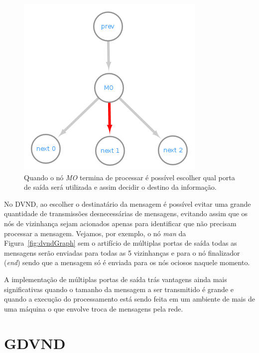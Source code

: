 \begin{figure}[htbp]
    \centerline{\includegraphics[scale=0.6]{figuras/dataflow/multi_output1.png}}
    \caption{Quando o nó \textit{MO} termina de processar é possível escolher qual porta de saída será utilizada e assim decidir o destino da informação.}
    \label{fig:dataflowMo1}
\end{figure}

No DVND, ao escolher o destinatário da mensagem é possível evitar uma grande quantidade de transmissões desnecessárias de mensagens, evitando assim que os nós de vizinhança sejam acionados apenas para identificar que não precisam processar a mensagem.
Vejamos, por exemplo, o nó \textit{man} da Figura~\ref{fig:dvndGraph} sem o artifício de múltiplas portas de saída todas as mensagens serão enviadas para todas as 5 vizinhanças e para o nó finalizador (\textit{end}) sendo que a mensagem só é enviada para os nós ociosos naquele momento.

A implementação de múltiplas portas de saída trás vantagens ainda mais significativas quando o tamanho da mensagem a ser transmitido é grande e quando a execução do processamento está sendo feita em um ambiente de mais de uma máquina o que envolve troca de mensagens pela rede.

\section{GDVND}\label{subsec:gdvnd}

